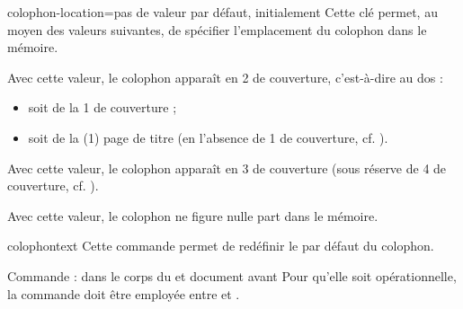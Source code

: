 {
  \begin{docKey}[][doc
    new=2020-03-26]{colophon-location}{=\textbar{}\textbar{}}{pas
      de valeur par défaut, initialement }
    Cette clé permet, au moyen des valeurs suivantes, de spécifier l'emplacement
    du colophon dans le mémoire.
  \begin{description}
  \item[\docValue{verso-frontcover}.]%
    Avec cette valeur, le colophon apparaît en 2\ieme{} de couverture,
    c'est-à-dire au dos :
    \begin{itemize}
    \item soit de la 1\iere{} de couverture ;
    \item soit de la (1\iere{}) page de titre (en l'absence de 1\iere{} de
      couverture, cf. ).
    \end{itemize}
  \item[\docValue{recto-backcover}.]%
    Avec cette valeur, le colophon apparaît en 3\ieme{} de couverture (sous
    réserve de 4\ieme{} de couverture, cf. ).
  \item[\docValue{nowhere}.]%
    Avec cette valeur, le colophon ne figure nulle part dans le mémoire.
  \end{description}
\end{docKey}
}

\begin{docCommand}[doc new=2020-03-26]{colophontext}{}
  Cette commande permet de redéfinir le  par défaut du colophon.

  \begin{dbwarning}{Commande \protect{} : dans le corps du
      et document avant \protect{}}{}
    Pour qu'elle soit opérationnelle, la commande  doit
    être employée entre \lstinline++ et .
  \end{dbwarning}
\end{docCommand}

